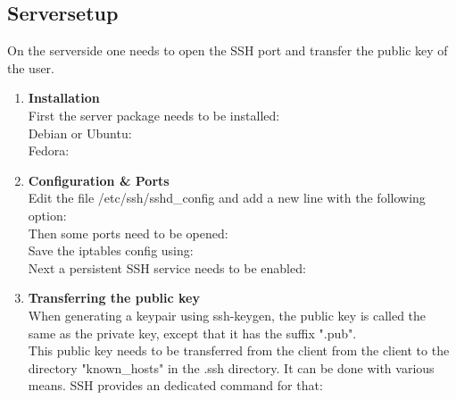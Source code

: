 \subsection{Serversetup}
On the serverside one needs to open the SSH port and transfer the public key of the user.  \\
\begin{enumerate}
    \item{\textbf{Installation}}\\
First the server package needs to be installed: \\
Debian or Ubuntu: \\
Fedora: \\
    \item{\textbf{Configuration \& Ports}}\\
Edit the file /etc/ssh/sshd\_config and add a new line with the following option: \\
Then some ports need to be opened:\\
Save the iptables config using:
\\
Next a persistent SSH service needs to be enabled: \\
    \item{\textbf{Transferring the public key}}\\
When generating a keypair using ssh-keygen, the public key is called the same as the private key, except that it has the suffix ".pub". \\
This public key needs to be transferred from the client from the client to the directory "known\_hosts" in the .ssh directory. It can be done with various means. SSH provides an dedicated command for that:\\
\end{enumerate}
